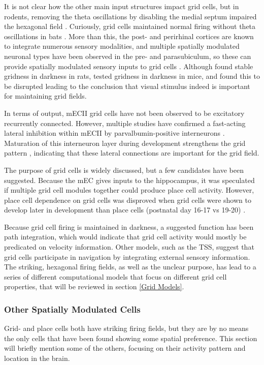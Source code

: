\documentclass{article}
\begin{document}
    It is not clear how the other main input structures impact grid cells, but in rodents, removing the theta oscillations by disabling the medial septum impaired the hexagonal field \parencite{Brandon2011,Koenig2011}. Curiously, grid cells maintained normal firing without theta oscillations in bats \parencite{Yartsev2011}. More than this, the post- and perirhinal cortices are known to integrate numerous sensory modalities, and multiple spatially modulated neuronal types have been observed in the pre- and parasubiculum, so these can provide spatially modulated sensory inputs to grid cells \parencite{Furtak2007,Groen1990}. Although \cite{Hafting2005} found stable gridness in darkness in rats, \cite{Chen2016} tested gridness in darkness in mice, and found this to be disrupted leading to the conclusion that visual stimulus indeed is important for maintaining grid fields.

    In terms of output, mECII grid cells have not been observed to be excitatory recurrently connected. However, multiple studies have confirmed a fast-acting lateral inhibition within mECII by parvalbumin-positive interneurons \parencite{Couey2013,Buetfering2014}. Maturation of this interneuron layer during development strengthens the grid pattern \parencite{Christensen2021}, indicating that these lateral connections are important for the grid field.

    The purpose of grid cells is widely discussed, but a few candidates have been suggested. Because the mEC gives inputs to the hippocampus, it was speculated if multiple grid cell modules together could produce place cell activity. However, place cell dependence on grid cells was disproved when grid cells were shown to develop later in development than place cells (postnatal day 16-17 vs 19-20) \parencite{Langston2010,Wills2010,Wills2012}.

    Because grid cell firing is maintained in darkness, a suggested function has been path integration, which would indicate that grid cell activity would mostly be predicated on velocity information. Other models, such as the TSS, suggest that grid cells participate in navigation by integrating external sensory information. The striking, hexagonal firing fields, as well as the unclear purpose, has lead to a series of different computational models that focus on different grid cell properties, that will be reviewed in section \ref{Grid Models}.

    \subsubsection{Other Spatially Modulated Cells}
    Grid- and place cells both have striking firing fields, but they are by no means the only cells that have been found showing some spatial preference. This section will briefly mention some of the others, focusing on their activity pattern and location in the brain.
    
\end{document}
